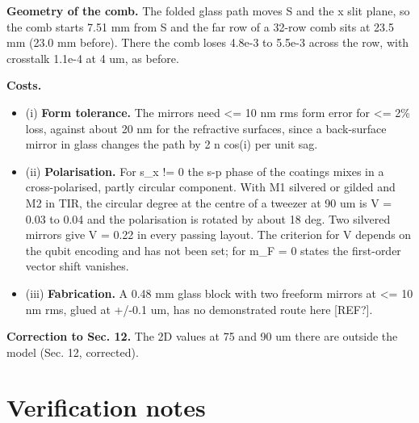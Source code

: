 \textbf{Geometry of the comb.} The folded glass path moves S and the x
slit plane, so the comb starts 7.51 mm from S and the far row of a
32-row comb sits at 23.5 mm (23.0 mm before). There the comb loses
4.8e-3 to 5.5e-3 across the row, with crosstalk 1.1e-4 at 4 um, as
before.

\textbf{Costs.}

\begin{itemize}
\tightlist
\item
  (i) \textbf{Form tolerance.} The mirrors need \textless= 10 nm rms
  form error for \textless= 2\% loss, against about 20 nm for the
  refractive surfaces, since a back-surface mirror in glass changes the
  path by 2 n cos(i) per unit sag.
\item
  (ii) \textbf{Polarisation.} For s\_x != 0 the s-p phase of the
  coatings mixes in a cross-polarised, partly circular component. With
  M1 silvered or gilded and M2 in TIR, the circular degree at the centre
  of a tweezer at 90 um is \textbar V\textbar{} = 0.03 to 0.04 and the
  polarisation is rotated by about 18 deg. Two silvered mirrors give
  \textbar V\textbar{} = 0.22 in every passing layout. The criterion for
  V depends on the qubit encoding and has not been set; for m\_F = 0
  states the first-order vector shift vanishes.
\item
  (iii) \textbf{Fabrication.} A 0.48 mm glass block with two freeform
  mirrors at \textless= 10 nm rms, glued at +/-0.1 um, has no
  demonstrated route here {[}REF?{]}.
\end{itemize}

\textbf{Correction to Sec. 12.} The 2D values at 75 and 90 um there are
outside the model (Sec. 12, corrected).

\hypertarget{verification-notes}{%
\section{Verification notes}\label{megascale-verification-notes}}

